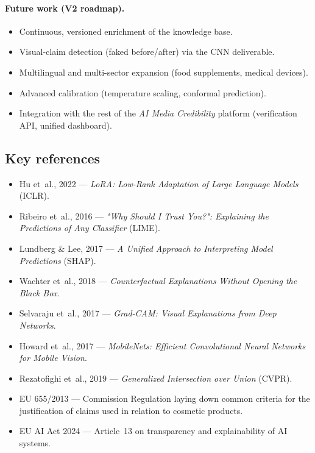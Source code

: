 \documentclass[11pt,a4paper]{article}
\begin{document}
\paragraph{Future work (V2 roadmap).}
\begin{itemize}[noitemsep]
  \item Continuous, versioned enrichment of the knowledge base.
  \item Visual-claim detection (faked before/after) via the CNN deliverable.
  \item Multilingual and multi-sector expansion (food supplements, medical
  devices).
  \item Advanced calibration (temperature scaling, conformal prediction).
  \item Integration with the rest of the \emph{AI Media Credibility} platform
  (verification API, unified dashboard).
\end{itemize}

\subsection*{Key references}
\begin{itemize}[noitemsep,leftmargin=*]
  \item Hu et~al., 2022 --- \emph{LoRA: Low-Rank Adaptation of Large Language Models} (ICLR).
  \item Ribeiro et~al., 2016 --- \emph{"Why Should I Trust You?": Explaining the Predictions of Any Classifier} (LIME).
  \item Lundberg \& Lee, 2017 --- \emph{A Unified Approach to Interpreting Model Predictions} (SHAP).
  \item Wachter et~al., 2018 --- \emph{Counterfactual Explanations Without Opening the Black Box}.
  \item Selvaraju et~al., 2017 --- \emph{Grad-CAM: Visual Explanations from Deep Networks}.
  \item Howard et~al., 2017 --- \emph{MobileNets: Efficient Convolutional Neural Networks for Mobile Vision}.
  \item Rezatofighi et~al., 2019 --- \emph{Generalized Intersection over Union} (CVPR).
  \item EU 655/2013 --- Commission Regulation laying down common criteria for the justification of claims used in relation to cosmetic products.
  \item EU AI Act 2024 --- Article~13 on transparency and explainability of AI systems.
\end{itemize}
\end{document}
